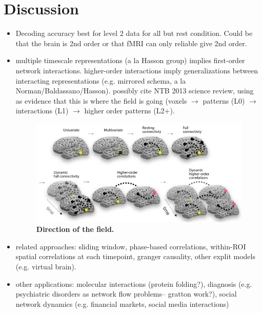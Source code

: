 \documentclass[english]{article}
\begin{document}
\section*{Discussion}


\begin{itemize}

\item Decoding accuracy best for level 2 data for all but rest
  condition.  Could be that the brain is 2nd order or that fMRI can
  only reliable give 2nd order.  
\item multiple timescale representations (a la Hasson group) implies
first-order network interactions.  higher-order interactions imply
generalizations between interacting representations (e.g. mirrored
schema, a la Norman/Baldassano/Hasson).  possibly cite NTB 2013
science review, using as evidence that this is where the field is
going (voxels $\rightarrow$ patterns (L0) $\rightarrow$ interactions (L1) $\rightarrow$ higher
order patterns (L2$+$).

\begin{figure}
  \centering
  \includegraphics[width=\textwidth]{figs/direction_of_field.pdf}
  \caption{\textbf{Direction of the field.} }
  \label{fig:direction_of_field}
\end{figure}

\item related approaches: sliding window, phase-based correlations,
within-ROI spatial correlations at each timepoint, granger
causality, other explit models (e.g. virtual brain).
\item other applications: molecular interactions (protein folding?),
diagnosis (e.g. psychiatric disorders as network flow problems--
gratton work?), social network dynamics (e.g. financial markets,
social media interactions)
\end{itemize}
\end{document}
